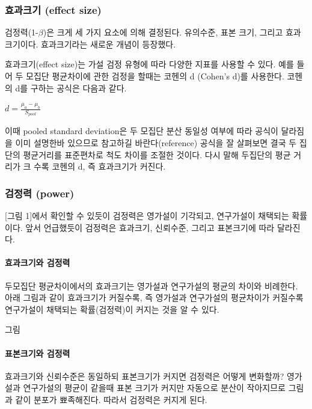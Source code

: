 \documentclass[
]{book}
\begin{document}
\subsubsection{효과크기 (effect size)}\label{uxd6a8uxacfcuxd06cuxae30-effect-size}

검정력(1-\(\beta\))은 크게 세 가지 요소에 의해 결정된다. 유의수준, 표본 크기, 그리고 효과크기이다. 효과크기라는 새로운 개념이 등장했다.

효과크기(effect size)는 가설 검정 유형에 따라 다양한 지표를 사용할 수 있다. 예를 들어 두 모집단 평균차이에 관한 검정을 할때는 코헨의 d (Cohen's d)를 사용한다. 코헨의 d를 구하는 공식은 다음과 같다.

\(d=\frac{\mu_{a}-\mu_{b}}{S_{pool}}\)

이때 pooled standard deviation은 두 모집단 분산 동일성 여부에 따라 공식이 달라짐을 이미 설명한바 있으므로 참고하길 바란다(reference)
공식을 잘 살펴보면 결국 두 집단의 평균거리를 표준편차로 척도 차이를 조절한 것이다. 다시 말해 두집단의 평균 거리가 크 수록 코헨의 d, 즉 효과크기가 커진다.

\subsubsection{검정력 (power)}\label{uxac80uxc815uxb825-power}

{[}그림 1{]}에서 확인할 수 있듯이 검정력은 영가설이 기각되고, 연구가설이 채택되는 확률이다. 앞서 언급했듯이 검정력은 효과크기, 신뢰수준, 그리고 표본크기에 따라 달라진다.

\paragraph{효과크기와 검정력}\label{uxd6a8uxacfcuxd06cuxae30uxc640-uxac80uxc815uxb825}

두모집단 평균차이에서의 효과크기는 영가설과 연구가설의 평균의 차이와 비례한다. 아래 그림과 같이 효과크기가 커질수록, 즉 영가설과 연구가설의 평균차이가 커질수록 연구가설이 채택되는 확률(검정력)이 커지는 것을 알 수 있다.

그림

\paragraph{표본크기와 검정력}\label{uxd45cuxbcf8uxd06cuxae30uxc640-uxac80uxc815uxb825}

효과크기와 신뢰수준은 동일하되 표본크기가 커지면 검정력은 어떻게 변화할까? 영가설과 연구가설의 평균이 같을때 표본 크기가 커지만 자동으로 분산이 작아지므로 그림과 같이 분포가 뾰족해진다. 따라서 검정력은 커지게 된다.
\end{document}
